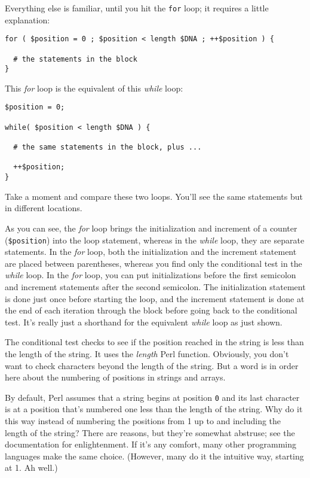 Everything else is familiar, until you hit the \verb|for| loop; it requires a little explanation: 

\begin{lstlisting}
for ( $position = 0 ; $position < length $DNA ; ++$position ) {
  
  # the statements in the block
}
\end{lstlisting}

This \textit{for} loop is the equivalent of this \textit{while} loop: 

\begin{lstlisting}
$position = 0;

while( $position < length $DNA ) {

  # the same statements in the block, plus ...

  ++$position;
}
\end{lstlisting}

Take a moment and compare these two loops. You'll see the same statements but in different locations.

As you can see, the \textit{for} loop brings the initialization and increment of a counter (\verb|$position|) into the loop statement, whereas in the \textit{while} loop, they are separate statements. In the \textit{for} loop, both the initialization and the increment statement are placed between parentheses, whereas you find only the conditional test in the \textit{while} loop. In the \textit{for} loop, you can put initializations before the first semicolon and increment statements after the second semicolon. The initialization statement is done just once before starting the loop, and the increment statement is done at the end of each iteration through the block before going back to the conditional test. It's really just a shorthand for the equivalent \textit{while} loop as just shown. 

The conditional test checks to see if the position reached in the string is less than the length of the string. It uses the \textit{length} Perl function.  Obviously, you don't want to check characters beyond the length of the string. But a word is in order here about the numbering of positions in strings and arrays.

By default, Perl assumes that a string begins at position \verb|0| and its last character is at a position that's numbered one less than the length of the string. Why do it this way instead of numbering the positions from 1 up to and including the length of the string? There are reasons, but they're somewhat abstruse; see the documentation for enlightenment. If it's any comfort, many other programming languages make the same choice. (However, many do it the intuitive way, starting at 1. Ah well.)

